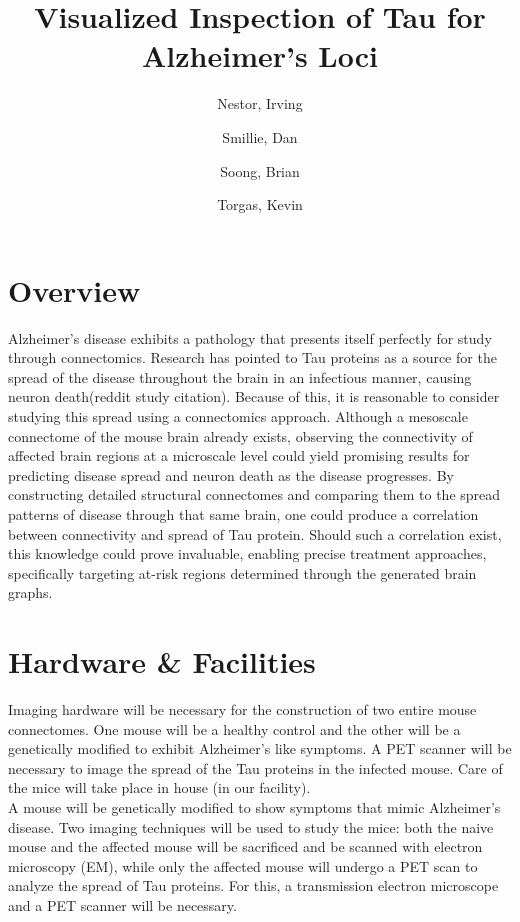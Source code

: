 \documentclass{article}
\title{Visualized Inspection of Tau for Alzheimer’s Loci}
\author{
  Nestor, Irving
  \and
  Smillie, Dan
  \and
  Soong, Brian
  \and
  Torgas, Kevin
}
\newcommand{\ind}[0]{\indent}
\begin{document}
\maketitle


\section{Overview}

\ind\ind Alzheimer’s disease exhibits a pathology that presents itself perfectly for study through connectomics. Research has pointed to Tau proteins as a source for the spread of the disease throughout the brain in an infectious manner, causing neuron death(reddit study citation). Because of this, it is reasonable to consider studying this spread using a connectomics approach. Although a mesoscale connectome of the mouse brain already exists, observing the connectivity of affected brain regions at a microscale level could yield promising results for predicting disease spread and neuron death as the disease progresses. By constructing detailed structural connectomes and comparing them to the spread patterns of disease through that same brain, one could produce a correlation between connectivity and spread of Tau protein. Should such a correlation exist, this knowledge could prove invaluable, enabling precise treatment approaches, specifically targeting at-risk regions determined through the generated brain graphs.


\section{Hardware \& Facilities}

\ind\ind Imaging hardware will be necessary for the construction of two entire mouse connectomes. One mouse will be a healthy control and the other will be a genetically modified to exhibit Alzheimer’s like symptoms. A PET scanner will be necessary to image the spread of the Tau proteins in the infected mouse. Care of the mice will take place in house (in our facility). \\

A mouse will be genetically modified to show symptoms that mimic Alzheimer's disease. Two imaging techniques will be used to study the mice: both the naive mouse and the affected mouse will be sacrificed and be scanned with electron microscopy (EM), while only the affected mouse will undergo a PET scan to analyze the spread of Tau proteins. For this, a transmission electron microscope and a PET scanner will be necessary. \\
\end{document}
